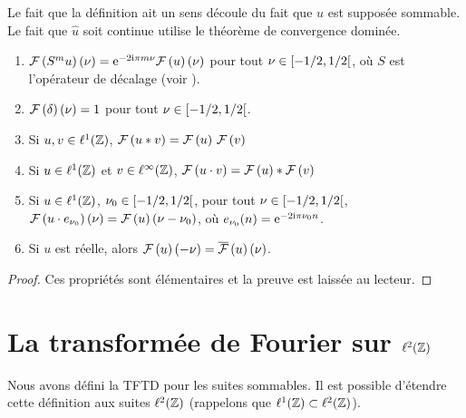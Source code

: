 Le fait que la d\'{e}finition ait un sens d\'{e}coule du fait que $u$ est suppos\'{e}e sommable. Le fait que $\hat{u}$ soit continue utilise le th\'{e}or\`{e}me de convergence domin\'{e}e.

\begin{proposition}
\label{prop:propriete-TFTD}
\begin{enumerate}[label=(\roman*)]
\item $\mathcal{F}\left( S^m u \right)(\nu)= \mathrm{e}^{- 2 \mathrm{i} \pi m \nu} \mathcal{F}\left( u \right)(\nu)$ pour tout $\nu \in \left[-1/2,1/2\right[$, où $S$ est l'opérateur de décalage (voir ).
\item $\mathcal{F}\left( \delta \right)(\nu) = 1$ pour tout $\nu \in \left[-1/2,1/2\right[$.
\item Si $u, v \in \ell^1(\mathbb{Z})$, $\mathcal{F}\left( u * v \right)= \mathcal{F}\left( u \right) \, \mathcal{F}\left( v \right)$
\item Si $u \in \ell^1(\mathbb{Z})$ et $v \in \ell^\infty(\mathbb{Z})$, $\mathcal{F}\left( u \cdot v \right)=\mathcal{F}\left( u \right)*\mathcal{F}\left( v \right)$
\item Si $u \in \ell^1(\mathbb{Z})$, $\nu_0 \in \left[-1/2,1/2\right[$, pour tout $\nu \in \left[-1/2,1/2\right[$,
$\mathcal{F}\left(  u \cdot e_{\nu_0} \right)(\nu)= \mathcal{F}\left( u \right)(\nu - \nu_0)$, o\`u $e_{\nu_0}(n) = \mathrm{e}^{-2 \mathrm{i} \pi \nu_0 n}$.
\item Si $u$ est r\'{e}elle, alors $\mathcal{F}\left( u \right)(-\nu) = \overline{\mathcal{F}}\left( u \right)(\nu)$.
\end{enumerate}
\end{proposition}
\begin{proof}
Ces propri\'et\'es sont \'el\'ementaires et la preuve est laiss\'ee au lecteur.
\end{proof}

\section{La transform\'ee de Fourier sur $\ell^2(\mathbb{Z})$}
Nous avons d\'{e}fini la TFTD pour les suites sommables. Il est possible d'\'{e}tendre cette d\'{e}finition aux suites $\ell^2(\mathbb{Z})$ (rappelons que $\ell^1(\mathbb{Z}) \subset \ell^2(\mathbb{Z})$).

